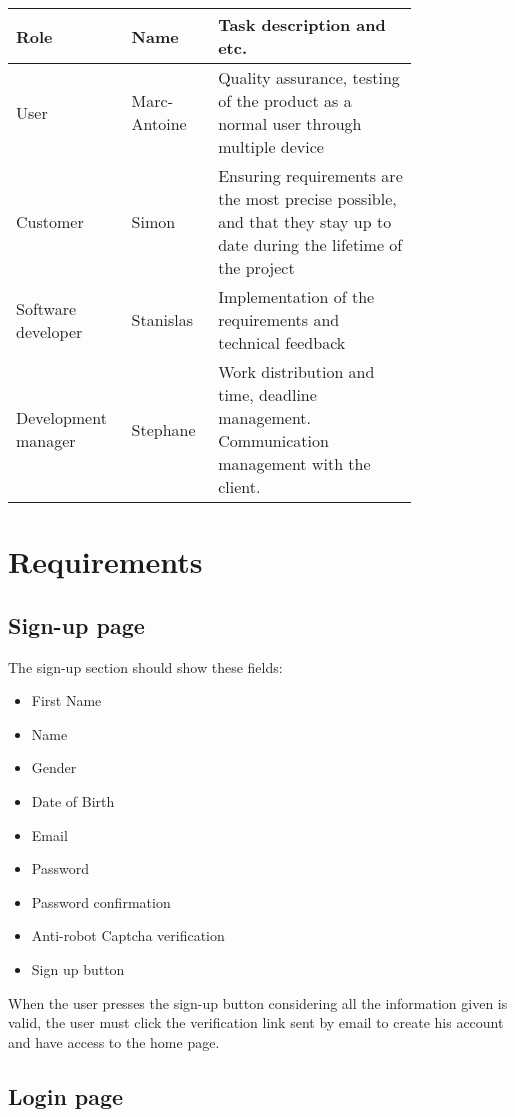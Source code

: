 \documentclass[conference]{IEEEtran}
\begin{document}
\begin{tabular}{ |p{0.2\linewidth}|p{0.15\linewidth}|p{0.45\linewidth}| }
\hline
Role & Name & Task description and etc. \\
\hline
User & Marc-Antoine & Quality assurance, testing of the product as a normal user through multiple device \\
\hline
Customer & Simon & Ensuring requirements are the most precise possible, and that they stay up to date during the lifetime of the project \\
\hline
Software developer & Stanislas & Implementation of the requirements and technical feedback \\
\hline
Development manager & Stephane & Work distribution and time, deadline management. Communication management with the client. \\
\hline
\end{tabular}

\section{Requirements}

\subsection{Sign-up page}

The sign-up section should show these fields:

\begin{itemize}
    \item First Name
    \item Name
    \item Gender
    \item Date of Birth
    \item Email
    \item Password
    \item Password confirmation
    \item Anti-robot Captcha verification
    \item Sign up button
\end{itemize}

When the user presses the sign-up button considering all
the information given is valid, the user must click the verification link sent by email to create his account and have access to the home page.

\subsection{Login page}
\end{document}

